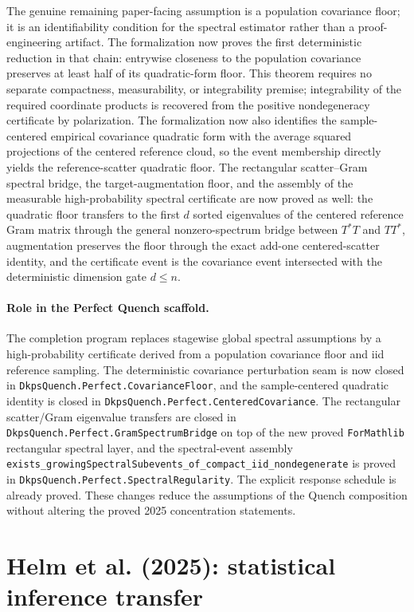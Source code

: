\documentclass[11pt]{article}
\newcommand{\code}[1]{\texttt{#1}}
\begin{document}
The genuine remaining paper-facing assumption is a population covariance
floor; it is an identifiability condition for the spectral estimator rather than
a proof-engineering artifact.  The formalization now proves the first
deterministic reduction in that chain: entrywise closeness to the population
covariance preserves at least half of its quadratic-form floor.  This theorem
requires no separate compactness, measurability, or integrability premise;
integrability of the required coordinate products is recovered from the
positive nondegeneracy certificate by polarization.  The formalization now
also identifies the sample-centered empirical covariance quadratic form with
the average squared projections of the centered reference cloud, so the event
membership directly yields the reference-scatter quadratic floor.  The
rectangular scatter--Gram spectral bridge, the target-augmentation floor, and
the assembly of the measurable high-probability spectral certificate are now
proved as well: the quadratic floor transfers to the first $d$ sorted
eigenvalues of the centered reference Gram matrix through the general
nonzero-spectrum bridge between $T^*T$ and $TT^*$, augmentation preserves the
floor through the exact add-one centered-scatter identity, and the certificate
event is the covariance event intersected with the deterministic dimension
gate $d \le n$.


\paragraph{Role in the Perfect Quench scaffold.}
The completion program replaces stagewise global spectral assumptions by a
high-probability certificate derived from a population covariance floor and iid
reference sampling.  The deterministic covariance perturbation seam is now
closed in \code{DkpsQuench.Perfect.CovarianceFloor}, and the sample-centered
quadratic identity is closed in \code{DkpsQuench.Perfect.CenteredCovariance}.
The rectangular scatter/Gram eigenvalue transfers are closed in
\code{DkpsQuench.Perfect.GramSpectrumBridge} on top of the new proved
\code{ForMathlib} rectangular spectral layer, and the spectral-event assembly
\code{exists\_growingSpectralSubevents\_of\_compact\_iid\_nondegenerate} is
proved in \code{DkpsQuench.Perfect.SpectralRegularity}.  The explicit response
schedule is already proved.  These changes reduce the assumptions of the
Quench composition without altering the proved 2025 concentration statements.

\section{Helm et al. (2025): statistical inference transfer}
\end{document}
